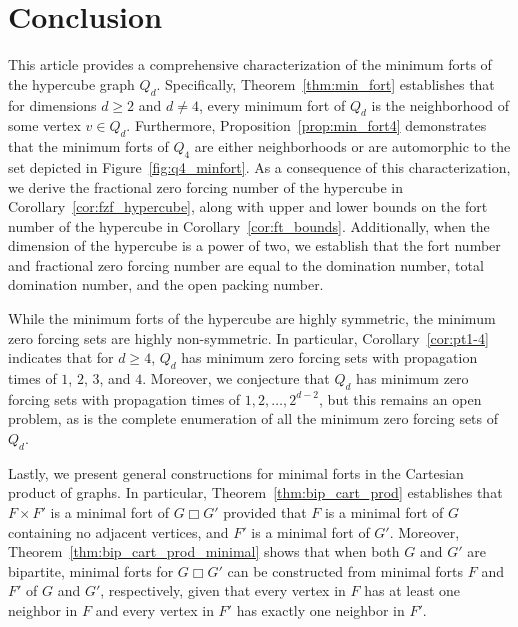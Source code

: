 \documentclass[twoside, 12pt]{article}
\theoremstyle{definition}
\DeclareMathOperator{\pt}{pt}
\DeclareMathOperator{\PT}{PT}
\begin{document}
\section{Conclusion}\label{sec:conclusion}
This article provides a comprehensive characterization of the minimum forts of the hypercube graph $Q_{d}$. Specifically, Theorem~\ref{thm:min_fort} establishes that for dimensions $d \geq 2$ and $d \neq 4$, every minimum fort of $Q_{d}$ is the neighborhood of some vertex $v \in Q_{d}$. Furthermore, Proposition~\ref{prop:min_fort4} demonstrates that the minimum forts of $Q_{4}$ are either neighborhoods or are automorphic to the set depicted in Figure~\ref{fig:q4_minfort}.
As a consequence of this characterization, we derive the fractional zero forcing number of the hypercube in Corollary~\ref{cor:fzf_hypercube}, along with upper and lower bounds on the fort number of the hypercube in Corollary~\ref{cor:ft_bounds}. Additionally, when the dimension of the hypercube is a power of two, we establish that the fort number and fractional zero forcing number are equal to the domination number, total domination number, and the open packing number.

While the minimum forts of the hypercube are highly symmetric, the minimum zero forcing sets are highly non-symmetric. In particular, Corollary~\ref{cor:pt1-4} indicates that for $d \geq 4$, $Q_{d}$ has minimum zero forcing sets with propagation times of $1$, $2$, $3$, and $4$. Moreover, we conjecture that $Q_d$ has minimum zero forcing sets with propagation times of $1, 2, \ldots, 2^{d-2}$, but this remains an open problem, as is the complete enumeration of all the minimum zero forcing sets of $Q_d$.


Lastly, we present general constructions for minimal forts in the Cartesian product of graphs. In particular, Theorem~\ref{thm:bip_cart_prod} establishes that $F \times F'$ is a minimal fort of $G \Box G'$ provided that $F$ is a minimal fort of $G$ containing no adjacent vertices, and $F'$ is a minimal fort of $G'$. Moreover, Theorem~\ref{thm:bip_cart_prod_minimal} shows that when both $G$ and $G'$ are bipartite, minimal forts for $G \Box G'$ can be constructed from minimal forts $F$ and $F'$ of $G$ and $G'$, respectively, given that every vertex in $F$ has at least one neighbor in $F$ and every vertex in $F'$ has exactly one neighbor in $F'$.
\end{document}
